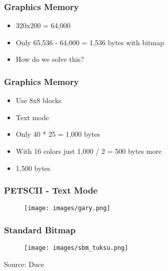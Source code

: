 \documentclass{beamer}
\begin{document}

\begin{frame}
\frametitle{Graphics Memory}

\begin{itemize}
\item 320x200 = 64,000
\item Only 65,536 - 64,000 = 1,536 bytes with bitmap
\item How do we solve this?
\end{itemize}

\end{frame}


\begin{frame}
\frametitle{Graphics Memory}

\begin{itemize}
\item Use 8x8 blocks
\item Text mode
\item Only 40 * 25 = 1,000 bytes
\item With 16 colors just 1,000 / 2 = 500 bytes more
\item 1,500 bytes
\end{itemize}

\end{frame}


\begin{frame}
\frametitle{PETSCII - Text Mode}

\begin{figure}
\texttt{[image: images/gary.png]}
\end{figure}

\end{frame}


\begin{frame}
\frametitle{Standard Bitmap}

\begin{figure}
\texttt{[image: images/sbm\_tuksu.png]}
\end{figure}

\begin{center}
Source: Duce
\end{center}

\end{frame}
\end{document}
